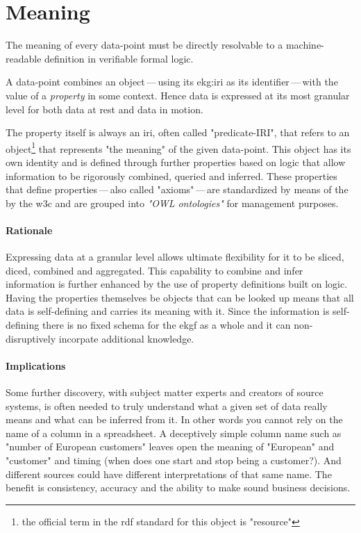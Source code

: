 \section{Meaning}\label{sec:ekg-principle-meaning}

The meaning of every \gls{data-point} must be directly resolvable
to a machine-readable definition in verifiable formal logic.

A \gls{data-point} combines an object\,---\,using its \gls{ekg:iri} as its identifier\,---\,with the value
of a \textit{property} in some context.
Hence data is expressed at its most granular level for both data at rest and data in motion.

The property itself is always an \gls{iri}, often called "predicate-IRI", that refers to an object\footnote{%
    the official term in the \gls{rdf} standard for this object is "resource"%
} that represents "the meaning" of the given \gls{data-point}.
This object has its own identity and is defined through further properties
based on logic that allow information to be rigorously combined, queried and inferred.
These properties that define properties\,---\,also called "axioms"\,---\,are standardized by means of the 
by the \gls{w3c} and are grouped into \textit{"OWL ontologies"} for management purposes.


\paragraph{Rationale} Expressing data at a granular level allows ultimate flexibility
for it to be sliced, diced, combined and aggregated. This capability to combine and
infer information is further enhanced by the use of \gls{property} definitions built on logic.
Having the properties themselves be objects that can be looked up means that all data
is self-defining and carries its meaning with it.
Since the information is self-defining there is no fixed schema for the \gls{ekgf}
as a whole and it can non-disruptively incorpate additional knowledge.

\paragraph{Implications} Some further discovery, with subject matter experts and
creators of source systems, is often needed to truly understand what a given
set of data really means and what can be inferred from it.
In other words you cannot rely on the name of a column in a spreadsheet.
A deceptively simple column name such as "number of European customers" leaves
open the meaning of "European" and "customer" and timing (when does one start
and stop being a customer?). And different sources could have different
interpretations of that same name.
The benefit is consistency, accuracy and the ability to make sound business decisions.

